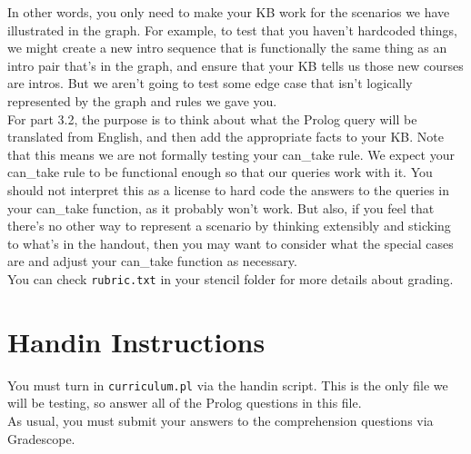 \documentclass{article}
\begin{document}
In other words, you only need to make your KB work for the scenarios we have illustrated in the graph.
For example, to test that you haven't hardcoded things, we might create a new intro sequence that is functionally the same thing as an intro pair that's in the graph, and ensure that your KB tells us those new courses are intros.
But we aren't going to test some edge case that isn't logically represented by the graph and rules we gave you.\\

For part 3.2, the purpose is to think about what the Prolog query will be translated from English, and then add the appropriate facts to your KB.
Note that this means we are not formally testing your can\_take rule.
We expect your can\_take rule to be functional enough so that our queries work with it.
You should not interpret this as a license to hard code the answers to the queries in your can\_take function, as it probably won't work.
But also, if you feel that there's no other way to represent a scenario by thinking extensibly and sticking to what's in the handout, then you may want to consider what the special cases are and adjust your can\_take function as necessary.\\

You can check \verb|rubric.txt| in your stencil folder for more details about grading.


\section{Handin Instructions}

You must turn in \verb|curriculum.pl| via the handin script. This is the only file we will be testing, so answer all of the Prolog questions in this file.\\

As usual, you must submit your answers to the comprehension questions via Gradescope.
\end{document}
